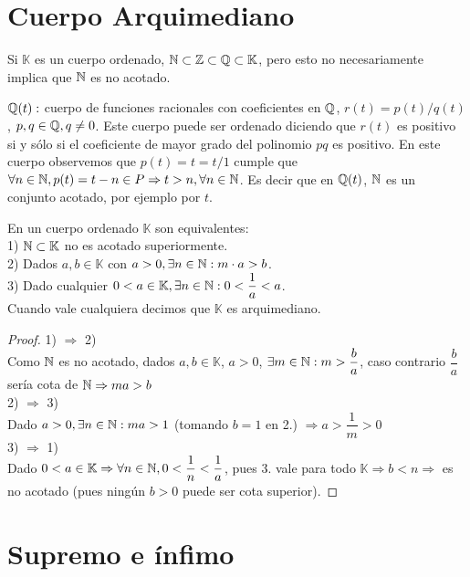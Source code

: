 \section{Cuerpo Arquimediano}

Si $\mathbb{K}$ es un cuerpo ordenado, $\mathbb{N} \subset \mathbb{Z} \subset \mathbb{Q} \subset \mathbb{K}$, pero esto no necesariamente implica que $\mathbb{N}$ es no acotado.

\begin{eg}
    $\mathbb{Q}(t):$ cuerpo de funciones racionales con coeficientes en $\mathbb{Q}$, $r(t) = p(t)/q(t)$, $p, q \in \mathbb{Q}, q \neq 0$. Este cuerpo puede ser ordenado diciendo que $r(t)$ es positivo si y sólo si el coeficiente de mayor grado del polinomio $pq$ es positivo.
    En este cuerpo observemos que $p(t)=t=t/1$ cumple que $\forall n \in \mathbb{N}, p(t)=t-n \in P \Rightarrow t>n, \forall n \in \mathbb{N}$. Es decir que en $\mathbb{Q}(t)$, $\mathbb{N}$ es un conjunto acotado, por ejemplo por $t$.
\end{eg}

\begin{theorem}
    En un cuerpo ordenado $\mathbb{K}$ son equivalentes: \\
    1) $\mathbb{N} \subset \mathbb{K}$ no es acotado superiormente. \\
    2) Dados $a, b \in \mathbb{K}$ con $a>0, \exists n \in \mathbb{N}:m \cdot a>b$. \\
    3) Dado cualquier $0<a \in \mathbb{K}, \exists n \in \mathbb{N} : 0 < \dfrac{1}a < a$. \\
    Cuando vale cualquiera decimos que $\mathbb{K}$ es arquimediano.
    \begin{proof}
        1) $\Rightarrow$ 2) \\
        Como $\mathbb{N}$ es no acotado, dados $a,b \in \mathbb{K}$, $a>0$, $\exists m \in \mathbb{N} : m > \dfrac ba$, caso contrario $\dfrac ba$ sería cota de $\mathbb{N} \Rightarrow ma>b$ \\
        2) $\Rightarrow$ 3) \\
        Dado $a>0, \exists n \in \mathbb{N} : ma>1$ (tomando $b=1$ en 2.) $\Rightarrow a>\dfrac 1m >0$ \\
        3) $\Rightarrow$ 1) \\
        Dado $0<a \in \mathbb{K} \Rightarrow \forall n \in \mathbb{N}, 0<\dfrac 1n<\dfrac 1a$, pues 3. vale para todo $\mathbb{K} \Rightarrow b<n \Rightarrow$ es no acotado (pues ningún $b>0$ puede ser cota superior).
    \end{proof}
\end{theorem}

\section{Supremo e ínfimo}

